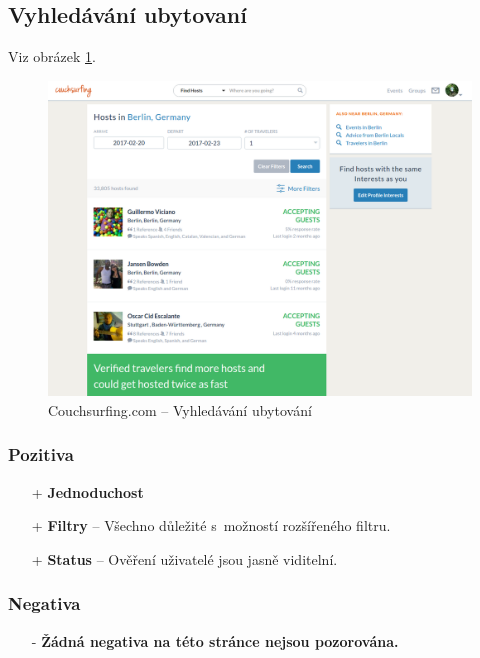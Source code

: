 
\newpage
\subsection{Vyhledávání ubytovaní}
Viz obrázek \ref{fig:couchsurfing:search}.
\begin{figure}[h]
    \centering
    \includegraphics[width=1.0\textwidth]{media/couchsurfing/search.png}
    \caption{Couchsurfing.com -- Vyhledávání ubytování}
    \label{fig:couchsurfing:search}
\end{figure}
\subsubsection*{Pozitiva}
\begin{itemize}
    \item[+] \textbf{Jednoduchost}
    \item[+] \textbf{Filtry} -- Všechno důležité s~možností rozšířeného filtru.
    \item[+] \textbf{Status} -- Ověření uživatelé jsou jasně viditelní.
\end{itemize}
\subsubsection*{Negativa}
\begin{itemize}
    \item[-] \textbf{Žádná negativa na této stránce nejsou pozorována.}
\end{itemize}



